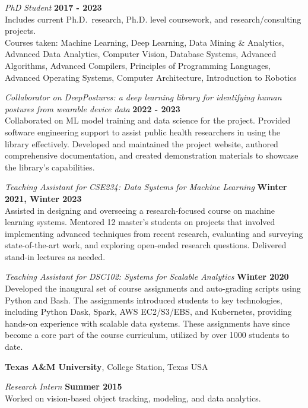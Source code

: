 \documentclass[margin,line]{res}
\begin{document}
\begin{resume}
\vspace{-.3cm}
{\em PhD Student} \hfill {\bf 2017 - 2023}\\
Includes current Ph.D.~research, Ph.D. level coursework, and
research/consulting projects.\\
Courses taken: Machine Learning, Deep Learning, Data Mining \& Analytics, Advanced Data Analytics, Computer Vision, Database Systems, Advanced Algorithms, Advanced Compilers, Principles of Programming Languages, Advanced Operating Systems, Computer Architecture, Introduction to Robotics

{\em Collaborator on DeepPostures: a deep learning library for identifying human postures from wearable device data} \hfill {\bf 2022 - 2023}\\
Collaborated on ML model training and data science for the project. Provided software engineering support to assist public health researchers in using the library effectively. Developed and maintained the project website, authored comprehensive documentation, and created demonstration materials to showcase the library’s capabilities.  

{\em Teaching Assistant for CSE234: Data Systems for Machine Learning} \hfill {\bf Winter 2021, Winter 2023}\\
Assisted in designing and overseeing a research-focused course on machine learning systems. Mentored 12 master’s students on projects that involved implementing advanced techniques from recent research, evaluating and surveying state-of-the-art work, and exploring open-ended research questions. Delivered stand-in lectures as needed.

{\em Teaching Assistant for DSC102: Systems for Scalable Analytics} \hfill {\bf Winter 2020}\\
Developed the inaugural set of course assignments and auto-grading scripts using Python and Bash. The assignments introduced students to key technologies, including Python Dask, Spark, AWS EC2/S3/EBS, and Kubernetes, providing hands-on experience with scalable data systems. These assignments have since become a core part of the course curriculum, utilized by over 1000 students to date.

{\bf Texas A\&M University}, College Station, Texas USA

\vspace{-.3cm}
{\em Research Intern} \hfill {\bf Summer 2015}\\
Worked on vision-based object tracking, modeling, and data analytics.


\end{resume}
\end{document}
